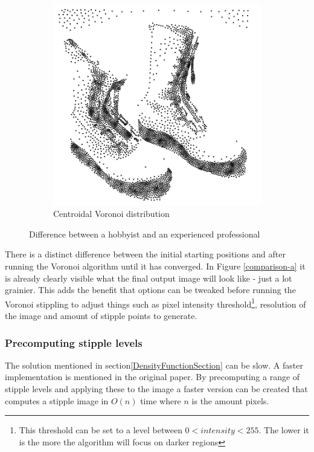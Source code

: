 \begin{figure}[!htb]
\begin{subfigure}[h]{0.4\linewidth}
\includegraphics[width=\linewidth]{images/voronoi_stippledshoes.png}
\caption{Centroidal Voronoi distribution}
\end{subfigure}%
\caption{Difference between a hobbyist and an experienced professional}
\label{comparison}
\end{figure}

There is a distinct difference between the initial starting positions and after running the Voronoi algorithm until it has converged. In Figure \ref{comparison-a} it is already clearly visible what the final output image will look like - just a lot grainier. This adds the benefit that options can be tweaked before running the Voronoi stippling to adjust things such as pixel intensity threshold\footnote{This threshold can be set to a level between \(0 < intensity < 255\). The lower it is the more the algorithm will focus on darker regions}, resolution of the image and amount of stipple points to generate.

\label{precompute-stipple-levels}
\subsubsection{Precomputing stipple levels}
The solution mentioned in section\ref{DensityFunctionSection} can be slow. A faster implementation is mentioned in the original paper\cite{Topalidou:2015}. By precomputing a range of stipple levels and applying these to the image a faster version can be created that computes a stipple image in \(O(n)\)  time where \(n\)  is the amount pixels.  

